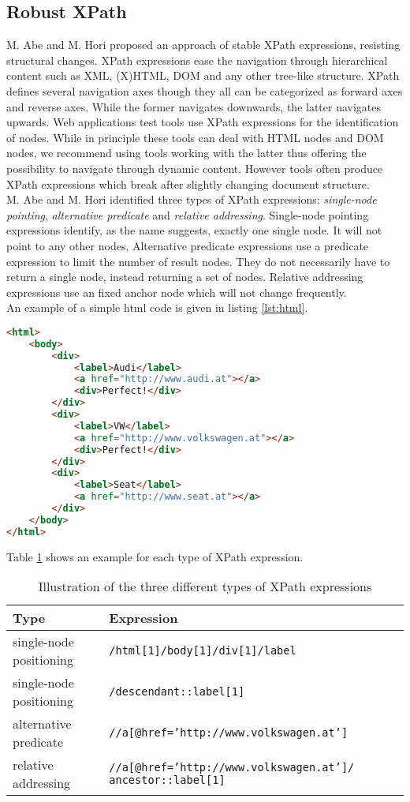 \documentclass[12pt, notitlepage]{article}
\begin{document}
\subsection{Robust XPath}
M. Abe and M. Hori proposed an approach\cite{robust-xpath} of stable XPath\cite{xpath} expressions, resisting structural changes.
XPath expressions ease the navigation through hierarchical content such as XML\cite{xml}, (X)HTML\cite{html}, DOM\cite{dom} and any other tree-like structure.
XPath defines several navigation axes though they all can be categorized as forward axes and reverse axes. While the former navigates downwards,
the latter navigates upwards. Web applications test tools use XPath expressions for the identification of nodes. While in principle these tools can deal with HTML
nodes and DOM nodes, we recommend using tools working with the latter thus offering the possibility to navigate through dynamic content. 
However tools often produce XPath expressions which break after slightly changing document structure. \\
M. Abe and M. Hori identified three types of XPath expressions: \textit{single-node pointing}, \textit{alternative predicate} and \textit{relative addressing}. 
Single-node pointing expressions identify, as the name suggests, exactly one single node. It will not point to any other nodes, Alternative predicate expressions
use a predicate expression to limit the number of result nodes. They do not necessarily have to return a single node, instead returning a set of nodes.
Relative addressing expressions use an fixed anchor node which will not change frequently.\\
An example of a simple html code is given in listing  \ref{lst:html}.
\begin{lstlisting}[language=HTML, caption={HTML code listing used as source for XPath expressions},label=lst:html]
<html>
	<body>
		<div>
			<label>Audi</label>
			<a href="http://www.audi.at"></a>
			<div>Perfect!</div>
		</div>
		<div>
			<label>VW</label>
			<a href="http://www.volkswagen.at"></a>
			<div>Perfect!</div>
		</div>
		<div>
			<label>Seat</label>
			<a href="http://www.seat.at"></a>
		</div>
	</body>
</html>
\end{lstlisting}
\vspace{1cm}
Table \ref{tab:xPath-expressions} shows an example for each type of XPath expression.
\begin{table}[H]
	\begin{tabularx}{\textwidth}{l|X}
		\textbf{Type} & \textbf{Expression} \\
		\hline
		single-node positioning & \texttt{/html[1]/body[1]/div[1]/label} \\
		single-node positioning & \texttt{/descendant::label[1]} \\
		alternative predicate & \texttt{//a[@href='http://www.volkswagen.at']} \\
		relative addressing & \texttt{//a[@href='http://www.volkswagen.at']/ ancestor::label[1]} \\
	\end{tabularx}
	\caption{Illustration of the three different types of XPath expressions}
	\label{tab:xPath-expressions}
\end{table}
\end{document}
